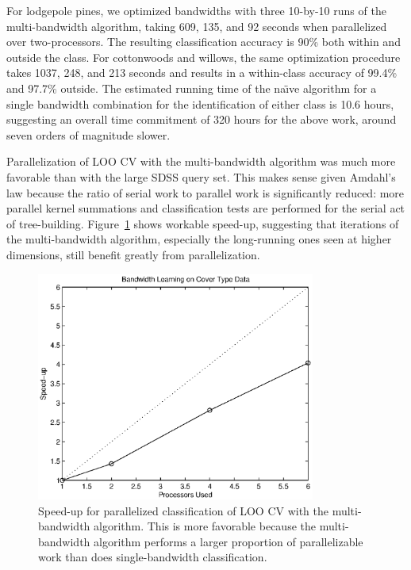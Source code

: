 \documentclass[twoside,leqno,twocolumn]{article}
\begin{document}
For lodgepole pines, we optimized bandwidths with three 10-by-10 runs
of the multi-bandwidth algorithm, taking 609, 135, and 92 seconds when
parallelized over two-processors.  The resulting classification
accuracy is 90\% both within and outside the class.  For cottonwoods
and willows, the same optimization procedure takes 1037, 248, and 213
seconds and results in a within-class accuracy of 99.4\% and 97.7\%
outside.  The estimated running time of the na\"{\i}ve algorithm for a
single bandwidth combination for the identification of either class is
10.6 hours, suggesting an overall time commitment of 320 hours for the
above work, around seven orders of magnitude slower.

Parallelization of LOO CV with the multi-bandwidth algorithm was much
more favorable than with the large SDSS query set.  This makes sense
given Amdahl's law because the ratio of serial work to parallel work
is significantly reduced: more parallel kernel summations and
classification tests are performed for the serial act of
tree-building.  Figure~\ref{fig:good-para-speedup} shows workable
speed-up, suggesting that iterations of the multi-bandwidth algorithm,
especially the long-running ones seen at higher dimensions, still
benefit greatly from parallelization.

\begin{figure}
  \begin{center}
    \hspace*{-.3in}
    \includegraphics[width=3.6in]{covtype_speedup.eps}
    \hspace*{-.3in}
  \end{center}
  \vspace{-15pt}
  \caption{\label{fig:good-para-speedup}\footnotesize Speed-up for
    parallelized classification of LOO CV with the multi-bandwidth
    algorithm.  This is more favorable because the multi-bandwidth
    algorithm performs a larger proportion of parallelizable work than
    does single-bandwidth classification.}
\end{figure}
\end{document}
